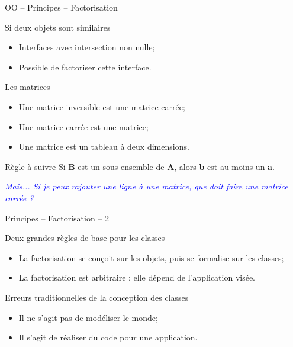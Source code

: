 \documentclass[handout,10pt]{beamer}
\begin{document}
\begin{frame}[fragile]{OO -- Principes -- Factorisation }
\begin{block}{Si deux objets sont similaires}
\begin{itemize}
\item Interfaces avec intersection non nulle;
\item Possible de factoriser cette interface.
\end{itemize}
\end{block}

\begin{exampleblock}{Les matrices}
\begin{itemize}
\item Une matrice inversible est une matrice carrée;
\item Une matrice carrée est une matrice;
\item Une matrice est un tableau à deux dimensions.
\end{itemize}
\end{exampleblock}

\begin{alertblock}{Règle à suivre}
Si \textbf{B} est un sous-ensemble de \textbf{A}, alors \textbf{b} est au moins un \textbf{a}.

\textsl{\textcolor{blue}{Mais... Si je peux rajouter une ligne à une matrice, que doit faire une matrice carrée ?}}
\end{alertblock}
\end{frame}

\begin{frame}{Principes -- Factorisation -- 2}
\begin{block}{Deux grandes règles de base pour les classes}
\begin{itemize}
\item La factorisation se conçoit sur les objets, puis se formalise sur les classes;
\item La factorisation est arbitraire : elle dépend de l'application visée.
\end{itemize}
\end{block}

\begin{alertblock}{Erreurs traditionnelles de la conception des classes}
\begin{itemize}
\item Il ne s'agit pas de modéliser le monde;
\item Il s'agit de réaliser du code pour une application.
\end{itemize}
\end{alertblock}
\end{frame}
\end{document}

